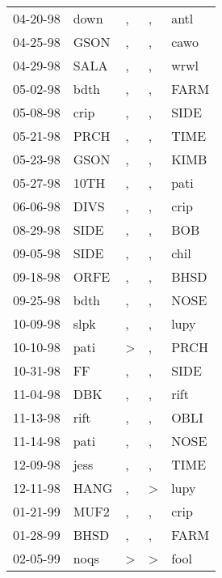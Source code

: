 \begin{supertabular}{lllll}
 04-20-98 &   down &                , &             , &   antl \\
 04-25-98 &   GSON &                , &             , &   cawo \\
 04-29-98 &   SALA &                , &             , &   wrwl \\
 05-02-98 &   bdth &                , &             , &   FARM \\
 05-08-98 &   crip &                , &             , &   SIDE \\
 05-21-98 &   PRCH &                , &             , &   TIME \\
 05-23-98 &   GSON &                , &             , &   KIMB \\
 05-27-98 &   10TH &                , &             , &   pati \\
 06-06-98 &   DIVS &                , &             , &   crip \\
 08-29-98 &   SIDE &                , &             , &    BOB \\
 09-05-98 &   SIDE &                , &             , &   chil \\
 09-18-98 &   ORFE &                , &             , &   BHSD \\
 09-25-98 &   bdth &                , &             , &   NOSE \\
 10-09-98 &   slpk &                , &             , &   lupy \\
 10-10-98 &   pati &     \textgreater &             , &   PRCH \\
 10-31-98 &     FF &                , &             , &   SIDE \\
 11-04-98 &    DBK &                , &             , &   rift \\
 11-13-98 &   rift &                , &             , &   OBLI \\
 11-14-98 &   pati &                , &             , &   NOSE \\
 12-09-98 &   jess &                , &             , &   TIME \\
 12-11-98 &   HANG &                , &  \textgreater &   lupy \\
 01-21-99 &   MUF2 &                , &             , &   crip \\
 01-28-99 &   BHSD &                , &             , &   FARM \\
 02-05-99 &   noqs &     \textgreater &  \textgreater &   fool \\

\end{supertabular}
